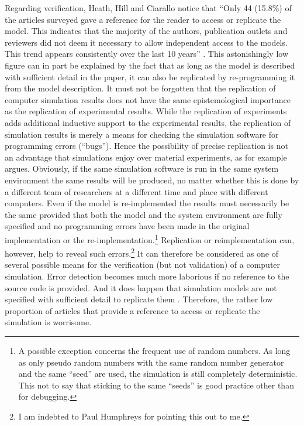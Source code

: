 \documentclass[12pt, english, a4paper]{article}
\begin{document}
Regarding verification, Heath, Hill and Ciarallo notice that ``Only 44
(15.8\%) of the articles surveyed gave a reference for the reader to
access or replicate the model. This indicates that the majority of the
authors, publication outlets and reviewers did not deem it necessary
to allow independent access to the models.  This trend appears
consistently over the last 10 years''
\citep[3.6]{heath-et-al:2009}. This astonishingly low figure can in
part be explained by the fact that as long as the model is described
with sufficient detail in the paper, it can also be replicated by
re-programming it from the model description. It must not be forgotten
that the replication of computer simulation results does not have the
same epistemological importance as the replication of experimental
results. While the replication of experiments adds additional
inductive support to the experimental results, the replication of
simulation results is merely a means for checking the simulation
software for programming errors (“bugs”). Hence the possibility of
precise replication is not an advantage that simulations enjoy over
material experiments, as for example \citet[248]{reiss:2011}
argues. Obviously, if the same simulation software is run in the same
system environment the same results will be produced, no matter
whether this is done by a different team of researchers at a different
time and place with different computers. Even if the model is
re-implemented the results must necessarily be the same provided that
both the model and the system environment are fully specified and no
programming errors have been made in the original implementation or
the re-implementation.\footnote{A possible exception concerns the
  frequent use of random numbers. As long as only pseudo random
  numbers with the same random number generator and the same “seed”
  are used, the simulation is still completely deterministic. This not
  to say that sticking to the same “seeds” is good practice other than
  for debugging.} Replication or reimplementation can, however, help
to reveal such errors.\footnote{I am indebted to Paul Humphreys for
  pointing this out to me.} It can therefore be considered as one of
several possible means for the verification (but not validation) of a
computer simulation. Error detection becomes much more laborious if no
reference to the source code is provided. And it does happen that
simulation models are not specified with sufficient detail to
replicate them \citep{will-hegselmann:2008}. Therefore, the rather low
proportion of articles that provide a reference to access or replicate
the simulation is worrisome.
\end{document}
